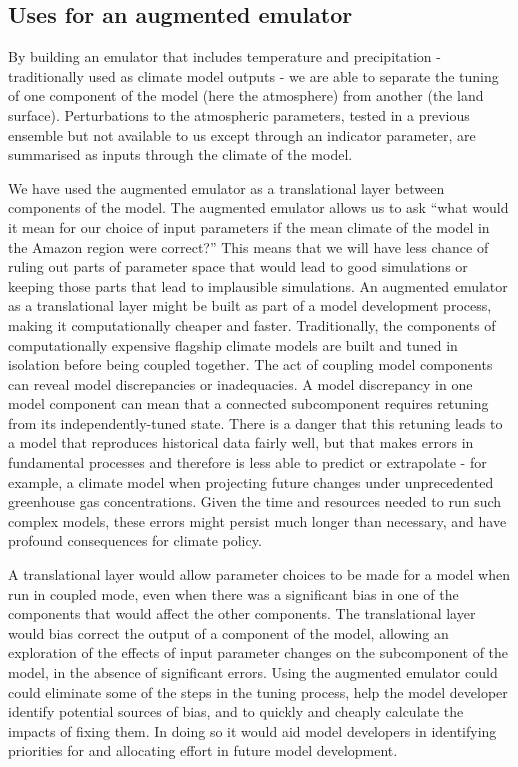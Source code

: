 \documentclass[gmd, manuscript]{copernicus}
\begin{document}


\subsection{Uses for an augmented emulator}\label{ssec:uses}
By building an emulator that includes temperature and precipitation - traditionally used as climate model outputs - we are able to separate the tuning of one component of the model (here the atmosphere) from another (the land surface). Perturbations to the atmospheric parameters, tested in a previous ensemble but not available to us except through an indicator parameter, are summarised as inputs through the climate of the model.

We have used the augmented emulator as a translational layer between components of the model. The augmented emulator allows us to ask ``what would it mean for our choice of input parameters if the mean climate of the model in the Amazon region were correct?'' This means that we will have less chance of ruling out parts of parameter space that would lead to good simulations or keeping those parts that lead to implausible simulations. An augmented emulator as a translational layer might be built as part of a model development process, making it computationally cheaper and faster. Traditionally, the components of computationally expensive flagship climate models are built and tuned in isolation before being coupled together. The act of coupling model components can reveal model discrepancies or inadequacies. A model discrepancy in one model component can mean that a connected subcomponent requires retuning from its independently-tuned state. There is a danger that this retuning leads to a model that reproduces historical data fairly well, but that makes errors in fundamental processes and therefore is less able to predict or extrapolate - for example, a climate model when projecting future changes under unprecedented greenhouse gas concentrations. Given the time and resources needed to run such complex models, these errors might persist much longer than necessary, and have profound consequences for climate policy. 

A translational layer would allow parameter choices to be made for a model when run in coupled mode, even when there was a significant bias in one of the components that would affect the other components. The translational layer would bias correct the output of a component of the model, allowing an exploration of the effects of input parameter changes on the subcomponent of the model, in the absence of significant errors. Using the augmented emulator could could eliminate some of the steps in the tuning process, help the model developer identify potential sources of bias, and to quickly and cheaply calculate the impacts of fixing them. In doing so it would aid model developers in identifying priorities for and allocating effort in future model development.
\end{document}
